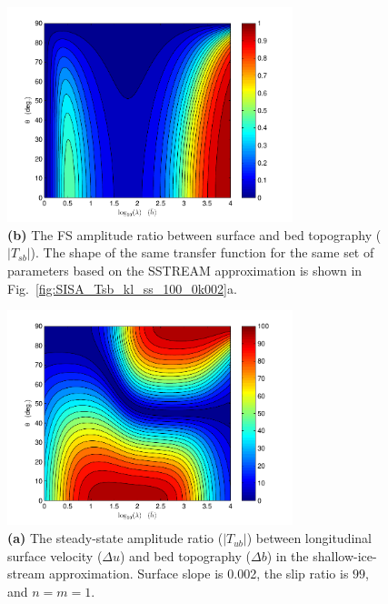 \documentclass[10pt,a4paper]{book}
\newcommand{\T}{T}
\begin{document}
\addtocounter{figure}{-1}

\begin{figure}
\vspace*{2mm}
\centerline{\includegraphics[width=8.3cm]{tc-2007-0016-f06b.pdf}}
\caption{{\bf (b)} The FS amplitude ratio between
surface and bed topography ($|\T_{sb}|$).  The shape of the same transfer function
for the same set of parameters based on the SSTREAM approximation is
shown in Fig.~\ref{fig:SISA_Tsb_kl_ss_100_0k002}a.
\label{fig:Tsbkl_ss_100_0k002}}
\end{figure}

\clearpage
\begin{figure}
\vspace*{2mm}
\centerline{\includegraphics[width=8.3cm]{tc-2007-0016-f07a.pdf}}
\caption{{\bf (a)} The steady-state amplitude ratio  ($|\T_{ub}|$) between
longitudinal surface velocity ($\Delta u$) and bed topography ($\Delta
b$) in the shallow-ice-stream approximation.  Surface slope is 0.002,
the slip ratio is $99$, and $n=m=1$.
\label{fig:SISA_Tub_kl_ss_100_0k002}}
\end{figure}

\addtocounter{figure}{-1}
\end{document}
